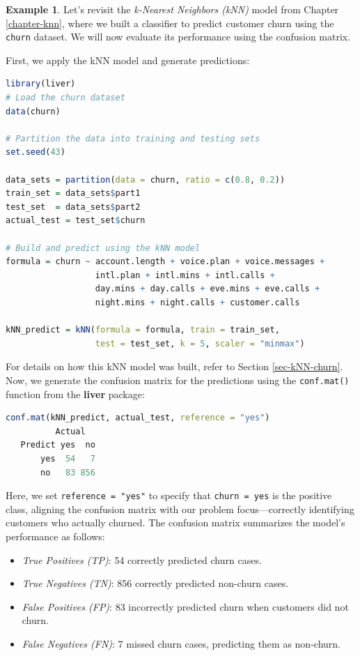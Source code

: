 \documentclass[
]{book}
\newcommand{\passthrough}[1]{#1}
\providecommand{\tightlist}{%
  \setlength{\itemsep}{0pt}\setlength{\parskip}{0pt}}
\theoremstyle{definition}
\theoremstyle{definition}
\newtheorem{example}{Example}[chapter]
\theoremstyle{definition}
\theoremstyle{definition}
\theoremstyle{remark}
\begin{document}
\begin{example}
\protect\hypertarget{exm:ex-confusion-matrix-kNN}{}\label{exm:ex-confusion-matrix-kNN}Let's revisit the \emph{k-Nearest Neighbors (kNN)} model from Chapter \ref{chapter-knn}, where we built a classifier to predict customer churn using the \passthrough{\lstinline!churn!} dataset. We will now evaluate its performance using the confusion matrix.

First, we apply the kNN model and generate predictions:

\begin{lstlisting}[language=R]
library(liver)  
# Load the churn dataset
data(churn)

# Partition the data into training and testing sets
set.seed(43)

data_sets = partition(data = churn, ratio = c(0.8, 0.2))
train_set = data_sets$part1
test_set  = data_sets$part2
actual_test = test_set$churn

# Build and predict using the kNN model
formula = churn ~ account.length + voice.plan + voice.messages + 
                  intl.plan + intl.mins + intl.calls + 
                  day.mins + day.calls + eve.mins + eve.calls + 
                  night.mins + night.calls + customer.calls

kNN_predict = kNN(formula = formula, train = train_set, 
                  test = test_set, k = 5, scaler = "minmax")
\end{lstlisting}

For details on how this kNN model was built, refer to Section \ref{sec-kNN-churn}. Now, we generate the confusion matrix for the predictions using the \passthrough{\lstinline!conf.mat()!} function from the \textbf{liver} package:

\begin{lstlisting}[language=R]
conf.mat(kNN_predict, actual_test, reference = "yes")
          Actual
   Predict yes  no
       yes  54   7
       no   83 856
\end{lstlisting}

Here, we set \passthrough{\lstinline!reference = "yes"!} to specify that \passthrough{\lstinline!churn = yes!} is the positive class, aligning the confusion matrix with our problem focus---correctly identifying customers who actually churned. The confusion matrix summarizes the model's performance as follows:

\begin{itemize}
\tightlist
\item
  \emph{True Positives (TP)}: 54 correctly predicted churn cases.\\
\item
  \emph{True Negatives (TN)}: 856 correctly predicted non-churn cases.\\
\item
  \emph{False Positives (FP)}: 83 incorrectly predicted churn when customers did not churn.\\
\item
  \emph{False Negatives (FN)}: 7 missed churn cases, predicting them as non-churn.
\end{itemize}


\end{example}
\end{document}
